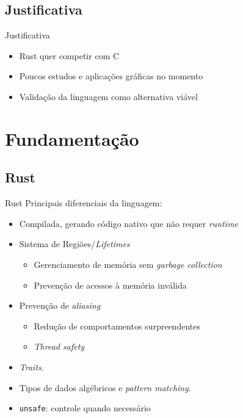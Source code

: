 \documentclass{beamer}
\def\Cpp{{C\nolinebreak[4]\raisebox{.2ex}{\scriptsize\bf++}}}
\begin{document}
\subsection{Justificativa}
\begin{frame}[fragile]{Justificativa}
	\begin{itemize}
		\item Rust quer competir com \Cpp
		\item Poucos estudos e aplicações gráficas no momento
		\item Validação da linguagem como alternativa viável
	\end{itemize}
\end{frame}

\section{Fundamentação}
\subsection{Rust}
\begin{frame}{Rust}
		Principais diferenciais da linguagem:
		\begin{overprint}
		\begin{itemize}
			\item Compilada, gerando código nativo que não requer \emph{runtime}
			\item Sistema de Regiões/\emph{Lifetimes}
			\begin{itemize}
				\item Gerenciamento de memória sem \emph{garbage collection}
				\item Prevenção de acessos à memória inválida
			\end{itemize}
			\item Prevenção de \emph{aliasing}
			\begin{itemize}
				\item Redução de comportamentos surpreendentes
				\item \emph{Thread safety}
			\end{itemize}
		\end{itemize}
		
		\begin{itemize}
			\item \emph{Traits}.
			\item Tipos de dados algébricos e \emph{pattern matching}.
			\item \texttt{unsafe}: controle quando necessário
		\end{itemize}
		\end{overprint}
\end{frame}
\end{document}
